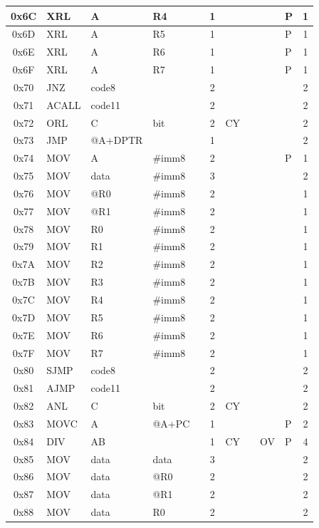 \documentclass[a4paper,twoside,12pt]{book}
\begin{document}
{\begin{longtable}{|c|l|lll|c|llll|c|}
		0x6C	& XRL	& A	& R4	&	& 1	&	&	&	& P	& 1	\\\hline
		0x6D	& XRL	& A	& R5	&	& 1	&	&	&	& P	& 1	\\\hline
		0x6E	& XRL	& A	& R6	&	& 1	&	&	&	& P	& 1	\\\hline
		0x6F	& XRL	& A	& R7	&	& 1	&	&	&	& P	& 1	\\\hline
		0x70	& JNZ	& code8	&	&	& 2	&	&	&	&	& 2	\\\hline
		0x71	& ACALL	& code11&	&	& 2	&	&	&	&	& 2	\\\hline
		0x72	& ORL	& C	& bit	&	& 2	& CY	&	&	&	& 2	\\\hline
		0x73	& JMP	&@A+DPTR&	&	& 1	&	&	&	&	& 2	\\\hline
		0x74	& MOV	& A	& \#imm8&	& 2	&	&	&	& P	& 1	\\\hline
		0x75	& MOV	& data	& \#imm8&	& 3	&	&	&	&	& 2	\\\hline
		0x76	& MOV	& @R0	& \#imm8&	& 2	&	&	&	&	& 1	\\\hline
		0x77	& MOV	& @R1	& \#imm8&	& 2	&	&	&	&	& 1	\\\hline
		0x78	& MOV	& R0	& \#imm8&	& 2	&	&	&	&	& 1	\\\hline
		0x79	& MOV	& R1	& \#imm8&	& 2	&	&	&	&	& 1	\\\hline
		0x7A	& MOV	& R2	& \#imm8&	& 2	&	&	&	&	& 1	\\\hline
		0x7B	& MOV	& R3	& \#imm8&	& 2	&	&	&	&	& 1	\\\hline
		0x7C	& MOV	& R4	& \#imm8&	& 2	&	&	&	&	& 1	\\\hline
		0x7D	& MOV	& R5	& \#imm8&	& 2	&	&	&	&	& 1	\\\hline
		0x7E	& MOV	& R6	& \#imm8&	& 2	&	&	&	&	& 1	\\\hline
		0x7F	& MOV	& R7	& \#imm8&	& 2	&	&	&	&	& 1	\\\hline
		0x80	& SJMP	& code8	&	&	& 2	&	&	&	&	& 2	\\\hline
		0x81	& AJMP	& code11&	&	& 2	&	&	&	&	& 2	\\\hline
		0x82	& ANL	& C	& bit	&	& 2	& CY	&	&	&	& 2	\\\hline
		0x83	& MOVC	& A	& @A+PC	&	& 1	&	&	&	& P	& 2	\\\hline
		0x84	& DIV	& AB	&	&	& 1	& CY	&	& OV	& P	& 4	\\\hline
		0x85	& MOV	& data	& data	&	& 3	&	&	&	&	& 2	\\\hline
		0x86	& MOV	& data	& @R0	&	& 2	&	&	&	&	& 2	\\\hline
		0x87	& MOV	& data	& @R1	&	& 2	&	&	&	&	& 2	\\\hline
		0x88	& MOV	& data	& R0	&	& 2	&	&	&	&	& 2	\\\hline

\end{longtable}}
\end{document}
